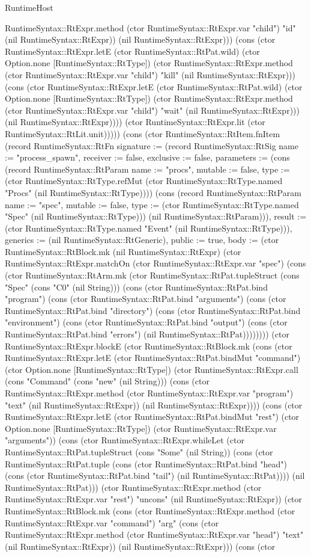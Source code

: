 \begin{lexlean}{RuntimeHost}
\begin{semanticmodule}
{RuntimeSyntax::RtExpr.method (ctor RuntimeSyntax::RtExpr.var "child") "id" (nil RuntimeSyntax::RtExpr)) (nil RuntimeSyntax::RtExpr))) (cons (ctor RuntimeSyntax::RtExpr.letE (ctor RuntimeSyntax::RtPat.wild) (ctor Option.none [RuntimeSyntax::RtType]) (ctor RuntimeSyntax::RtExpr.method (ctor RuntimeSyntax::RtExpr.var "child") "kill" (nil RuntimeSyntax::RtExpr))) (cons (ctor RuntimeSyntax::RtExpr.letE (ctor RuntimeSyntax::RtPat.wild) (ctor Option.none [RuntimeSyntax::RtType]) (ctor RuntimeSyntax::RtExpr.method (ctor RuntimeSyntax::RtExpr.var "child") "wait" (nil RuntimeSyntax::RtExpr))) (nil RuntimeSyntax::RtExpr)))) (ctor RuntimeSyntax::RtExpr.lit (ctor RuntimeSyntax::RtLit.unit)))})) (cons (ctor RuntimeSyntax::RtItem.fnItem (record RuntimeSyntax::RtFn {signature := (record RuntimeSyntax::RtSig {name := "process_spawn", receiver := false, exclusive := false, parameters := (cons (record RuntimeSyntax::RtParam {name := "procs", mutable := false, type := (ctor RuntimeSyntax::RtType.refMut (ctor RuntimeSyntax::RtType.named "Procs" (nil RuntimeSyntax::RtType)))}) (cons (record RuntimeSyntax::RtParam {name := "spec", mutable := false, type := (ctor RuntimeSyntax::RtType.named "Spec" (nil RuntimeSyntax::RtType))}) (nil RuntimeSyntax::RtParam))), result := (ctor RuntimeSyntax::RtType.named "Event" (nil RuntimeSyntax::RtType))}), generics := (nil RuntimeSyntax::RtGeneric), public := true, body := (ctor RuntimeSyntax::RtBlock.mk (nil RuntimeSyntax::RtExpr) (ctor RuntimeSyntax::RtExpr.matchOn (ctor RuntimeSyntax::RtExpr.var "spec") (cons (ctor RuntimeSyntax::RtArm.mk (ctor RuntimeSyntax::RtPat.tupleStruct (cons "Spec" (cons "C0" (nil String))) (cons (ctor RuntimeSyntax::RtPat.bind "program") (cons (ctor RuntimeSyntax::RtPat.bind "arguments") (cons (ctor RuntimeSyntax::RtPat.bind "directory") (cons (ctor RuntimeSyntax::RtPat.bind "environment") (cons (ctor RuntimeSyntax::RtPat.bind "output") (cons (ctor RuntimeSyntax::RtPat.bind "errors") (nil RuntimeSyntax::RtPat)))))))) (ctor RuntimeSyntax::RtExpr.blockE (ctor RuntimeSyntax::RtBlock.mk (cons (ctor RuntimeSyntax::RtExpr.letE (ctor RuntimeSyntax::RtPat.bindMut "command") (ctor Option.none [RuntimeSyntax::RtType]) (ctor RuntimeSyntax::RtExpr.call (cons "Command" (cons "new" (nil String))) (cons (ctor RuntimeSyntax::RtExpr.method (ctor RuntimeSyntax::RtExpr.var "program") "text" (nil RuntimeSyntax::RtExpr)) (nil RuntimeSyntax::RtExpr)))) (cons (ctor RuntimeSyntax::RtExpr.letE (ctor RuntimeSyntax::RtPat.bindMut "rest") (ctor Option.none [RuntimeSyntax::RtType]) (ctor RuntimeSyntax::RtExpr.var "arguments")) (cons (ctor RuntimeSyntax::RtExpr.whileLet (ctor RuntimeSyntax::RtPat.tupleStruct (cons "Some" (nil String)) (cons (ctor RuntimeSyntax::RtPat.tuple (cons (ctor RuntimeSyntax::RtPat.bind "head") (cons (ctor RuntimeSyntax::RtPat.bind "tail") (nil RuntimeSyntax::RtPat)))) (nil RuntimeSyntax::RtPat))) (ctor RuntimeSyntax::RtExpr.method (ctor RuntimeSyntax::RtExpr.var "rest") "uncons" (nil RuntimeSyntax::RtExpr)) (ctor RuntimeSyntax::RtBlock.mk (cons (ctor RuntimeSyntax::RtExpr.method (ctor RuntimeSyntax::RtExpr.var "command") "arg" (cons (ctor RuntimeSyntax::RtExpr.method (ctor RuntimeSyntax::RtExpr.var "head") "text" (nil RuntimeSyntax::RtExpr)) (nil RuntimeSyntax::RtExpr))) (cons (ctor }
\end{semanticmodule}
\end{lexlean}
